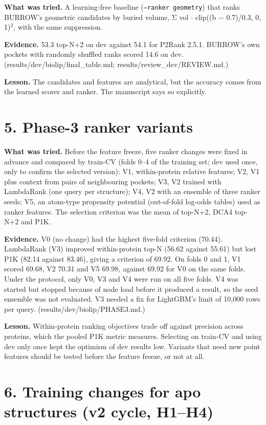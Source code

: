 \documentclass[10pt,letterpaper]{article}
\begin{document}
\textbf{What was tried.} A learning-free baseline (\texttt{--ranker geometry}) that ranks BURROW's geometric candidates by buried volume, Σ vol $\cdot$ clip((b $-$ 0.7)/0.3, 0, 1)$^{2}$, with the same suppression.

\textbf{Evidence.} 53.3 top-N+2 on dev against 54.1 for P2Rank 2.5.1. BURROW's own pockets with randomly shuffled ranks scored 14.6 on dev. (results/dev/biolip/final\_table.md; results/review\_dev/REVIEW.md.)

\textbf{Lesson.} The candidates and features are analytical, but the accuracy comes from the learned scorer and ranker. The manuscript says so explicitly.

\section*{5. Phase-3 ranker variants}

\textbf{What was tried.} Before the feature freeze, five ranker changes were fixed in advance and compared by train-CV (folds 0--4 of the training set; dev used once, only to confirm the selected version): V1, within-protein relative features; V2, V1 plus context from pairs of neighbouring pockets; V3, V2 trained with LambdaRank (one query per structure); V4, V2 with an ensemble of three ranker seeds; V5, an atom-type propensity potential (out-of-fold log-odds tables) used as ranker features. The selection criterion was the mean of top-N+2, DCA4 top-N+2 and P1K.

\textbf{Evidence.} V0 (no change) had the highest five-fold criterion (70.44). LambdaRank (V3) improved within-protein top-N (56.62 against 55.61) but lost P1K (82.14 against 83.46), giving a criterion of 69.92. On folds 0 and 1, V1 scored 69.68, V2 70.31 and V5 69.98, against 69.92 for V0 on the same folds. Under the protocol, only V0, V3 and V4 were run on all five folds. V4 was started but stopped because of node load before it produced a result, so the seed ensemble was not evaluated. V3 needed a fix for LightGBM's limit of 10,000 rows per query. (results/dev/biolip/PHASE3.md.)

\textbf{Lesson.} Within-protein ranking objectives trade off against precision across proteins, which the pooled P1K metric measures. Selecting on train-CV and using dev only once kept the optimism of dev results low. Variants that need new point features should be tested before the feature freeze, or not at all.

\section*{6. Training changes for apo structures (v2 cycle, H1--H4)}
\end{document}
